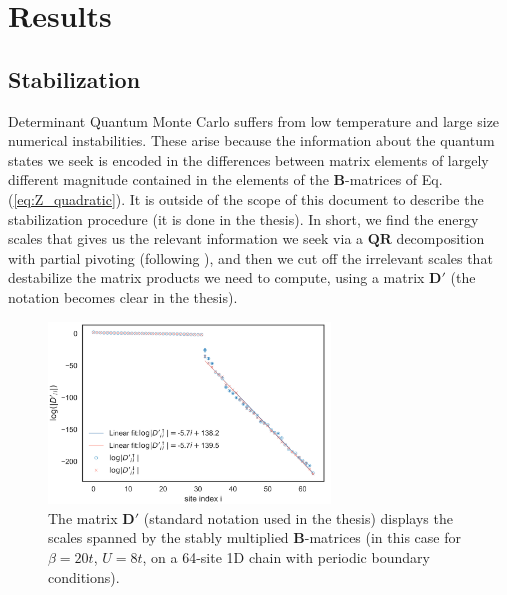 
\section{Results}
\label{sec:imple}
\vspace{0.5cm}
\subsection{Stabilization}
Determinant Quantum Monte Carlo suffers from low temperature and large size numerical instabilities.
These arise because the information about the quantum states we seek is encoded in the differences between matrix elements of largely different magnitude contained in the elements of the $\bm B$-matrices of Eq.(\ref{eq:Z_quadratic}).
It is outside of the scope of this document to describe the stabilization procedure (it is done in the thesis).
In short, we find the energy scales that gives us the relevant information we seek via a $\bm Q \bm R$ decomposition with partial pivoting (following \cite{bai_stable_2011}), and then we cut off the irrelevant scales that destabilize the matrix products we need to compute, using a matrix $\bm D'$ (the notation becomes clear in the thesis).
\begin{figure}[H]
  \centering
  \includegraphics[width =7.5cm]{images/OrdersOfMagnitude_N=64sites.png}
  \caption{The matrix $\bm D'$ (standard notation used in the thesis) displays the scales spanned by the stably multiplied $\bm B$-matrices (in this case for $\beta = 20t$, $U = 8t$, on a 64-site 1D chain with periodic boundary conditions).}
  \label{fig:numerical_scales}
\end{figure}
